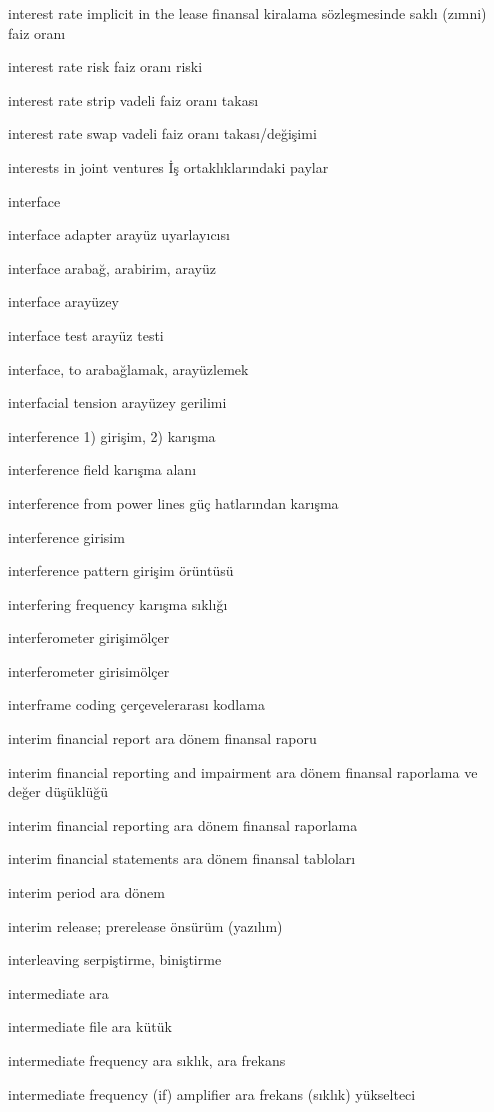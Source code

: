 \documentclass[12pt,fleqn]{article}\usepackage{../../common}
\begin{document}
interest rate implicit in the lease finansal kiralama sözleşmesinde saklı (zımni) faiz oranı

interest rate risk faiz oranı riski

interest rate strip vadeli faiz oranı takası

interest rate swap vadeli faiz oranı takası/değişimi

interests in joint ventures İş ortaklıklarındaki paylar

interface

interface adapter arayüz uyarlayıcısı

interface arabağ, arabirim, arayüz

interface arayüzey

interface test arayüz testi

interface, to arabağlamak, arayüzlemek

interfacial tension arayüzey gerilimi

interference 1) girişim, 2) karışma

interference field karışma alanı

interference from power lines güç hatlarından karışma

interference girisim

interference pattern girişim örüntüsü

interfering frequency karışma sıklığı

interferometer girişimölçer

interferometer girisimölçer

interframe coding çerçevelerarası kodlama

interim financial report ara dönem finansal raporu

interim financial reporting and impairment ara dönem finansal raporlama ve değer düşüklüğü

interim financial reporting ara dönem finansal raporlama

interim financial statements ara dönem finansal tabloları

interim period ara dönem

interim release; prerelease önsürüm (yazılım)

interleaving serpiştirme, biniştirme

intermediate ara

intermediate file ara kütük

intermediate frequency ara sıklık, ara frekans

intermediate frequency (if) amplifier ara frekans (sıklık) yükselteci
\end{document}
